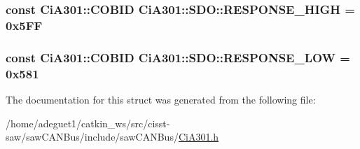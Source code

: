 \hypertarget{struct_ci_a301_1_1_s_d_o_aef5fb9c8aa9d87537b049f57fe4bcd53}{
\subsubsection[{R\-E\-S\-P\-O\-N\-S\-E\-\_\-\-H\-I\-G\-H}]{\setlength{\rightskip}{0pt plus 5cm}const {\bf Ci\-A301\-::\-C\-O\-B\-I\-D} Ci\-A301\-::\-S\-D\-O\-::\-R\-E\-S\-P\-O\-N\-S\-E\-\_\-\-H\-I\-G\-H = 0x5\-F\-F\hspace{0.3cm}{\ttfamily [static]}}}\label{struct_ci_a301_1_1_s_d_o_aef5fb9c8aa9d87537b049f57fe4bcd53}
\hypertarget{struct_ci_a301_1_1_s_d_o_a4d1cfd74034335f16b43a11f8e804029}{
\subsubsection[{R\-E\-S\-P\-O\-N\-S\-E\-\_\-\-L\-O\-W}]{\setlength{\rightskip}{0pt plus 5cm}const {\bf Ci\-A301\-::\-C\-O\-B\-I\-D} Ci\-A301\-::\-S\-D\-O\-::\-R\-E\-S\-P\-O\-N\-S\-E\-\_\-\-L\-O\-W = 0x581\hspace{0.3cm}{\ttfamily [static]}}}\label{struct_ci_a301_1_1_s_d_o_a4d1cfd74034335f16b43a11f8e804029}


The documentation for this struct was generated from the following file\-:\begin{DoxyCompactItemize}
\item 
/home/adeguet1/catkin\-\_\-ws/src/cisst-\/saw/saw\-C\-A\-N\-Bus/include/saw\-C\-A\-N\-Bus/\hyperlink{_ci_a301_8h}{Ci\-A301.\-h}\end{DoxyCompactItemize}
